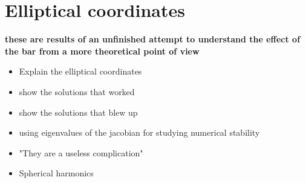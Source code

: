 \section{Elliptical coordinates}
    \textbf{these are results of an unfinished attempt to understand the effect of the bar from a more theoretical point of view}
    \begin{itemize}
        \item Explain the elliptical coordinates 
        \item show the solutions that worked
        \item show the solutions that blew up 
        \item using eigenvalues of the jacobian for studying numerical stability 
        \item "They are a useless complication"
        \item Spherical harmonics 
    \end{itemize}


